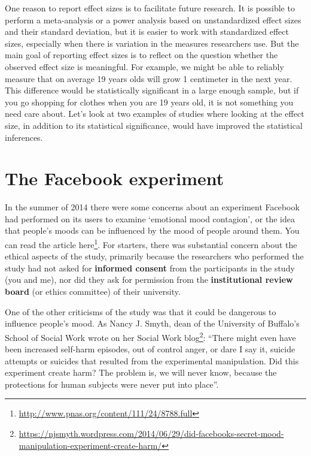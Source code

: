 \documentclass[
  oneside]{krantz}
\renewcommand{\href}[2]{#2\footnote{\url{#1}}}
\begin{document}
One reason to report effect sizes is to facilitate future research. It is possible to perform a meta-analysis or a power analysis based on unstandardized effect sizes and their standard deviation, but it is easier to work with standardized effect sizes, especially when there is variation in the measures researchers use. But the main goal of reporting effect sizes is to reflect on the question whether the observed effect size is meaningful. For example, we might be able to reliably measure that on average 19 years olds will grow 1 centimeter in the next year. This difference would be statistically significant in a large enough sample, but if you go shopping for clothes when you are 19 years old, it is not something you need care about. Let's look at two examples of studies where looking at the effect size, in addition to its statistical significance, would have improved the statistical inferences.

\hypertarget{the-facebook-experiment}{%
\section{The Facebook experiment}\label{the-facebook-experiment}}

In the summer of 2014 there were some concerns about an experiment Facebook had performed on its users to examine `emotional mood contagion', or the idea that people's moods can be influenced by the mood of people around them. You can read the article \href{http://www.pnas.org/content/111/24/8788.full}{here}. For starters, there was substantial concern about the ethical aspects of the study, primarily because the researchers who performed the study had not asked for \textbf{informed consent} from the participants in the study (you and me), nor did they ask for permission from the \textbf{institutional review board} (or ethics committee) of their university.

One of the other criticisms of the study was that it could be dangerous to influence people's mood. As Nancy J. Smyth, dean of the University of Buffalo's School of Social Work wrote on her \href{https://njsmyth.wordpress.com/2014/06/29/did-facebooks-secret-mood-manipulation-experiment-create-harm/}{Social Work blog}: ``There might even have been increased self-harm episodes, out of control anger, or dare I say it, suicide attempts or suicides that resulted from the experimental manipulation. Did this experiment create harm? The problem is, we will never know, because the protections for human subjects were never put into place''.
\end{document}
